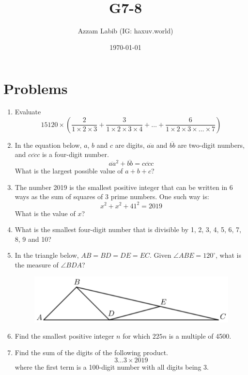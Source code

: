 \documentclass[11pt]{scrartcl}
\title{G7-8}
\author{Azzam Labib (IG: haxuv.world)}
\date{\today}
\begin{document}
\maketitle
\section{Problems}
\begin{enumerate}
\item Evaluate
    $$15120 \times \left(\dfrac{2}{1 \times 2 \times 3} + \dfrac{3}{1 \times 2 \times 3 \times 4}+\dots+\dfrac{6}{1\times 2 \times 3 \times \ldots \times 7} \right)$$

\item In the equation below, $a$, $b$ and $c$ are digits, $\overline{aa}$ and $\overline{bb}$ are two-digit numbers, and $\overline{cccc}$ is a four-digit number.
\[\overline{aa}^2 + \overline{bb} = \overline{cccc}\]
What is the largest possible value of $a + b + c$?

\item The number 2019 is the smallest positive integer that can be written in 6 ways as the sum of squares of 3 prime numbers. One such way is:
\[x^2 + x^2 + 41^2 = 2019\]
What is the value of $x$?

\item What is the smallest four-digit number that is divisible by 1, 2, 3, 4, 5, 6, 7, 8, 9 and 10?

\item In the triangle below, $AB = BD = DE = EC$. Given $\angle ABE = 120^\circ$, what is the measure of $\angle BDA$?
\begin{figure}[h]
    \centering
    \includegraphics[scale=0.5]{Test For Pelatihan/triangle.png}
\end{figure}

\item Find the smallest positive integer $n$ for which $225n$ is a multiple of 4500.

\item Find the sum of the digits of the following product.
\[3\ldots 3 \times 2019\]
where the first term is a 100-digit number with all digits being 3.


\end{enumerate}
\end{document}

